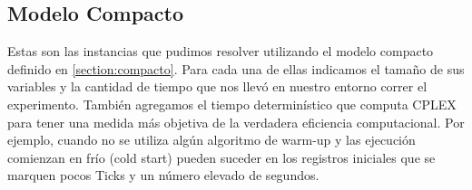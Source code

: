 \subsection{Modelo Compacto}

Estas son las instancias que pudimos resolver utilizando el modelo compacto definido en \ref{section:compacto}. Para cada una de ellas indicamos el tamaño de sus variables y la cantidad de tiempo que nos llevó en nuestro entorno correr el experimento. También agregamos el tiempo determinístico que computa CPLEX para tener una medida más objetiva de la verdadera eficiencia computacional. Por ejemplo, cuando no se utiliza algún algoritmo de warm-up y las ejecución comienzan en frío (cold start) pueden suceder en los registros iniciales que se marquen pocos Ticks y un número elevado de segundos.

